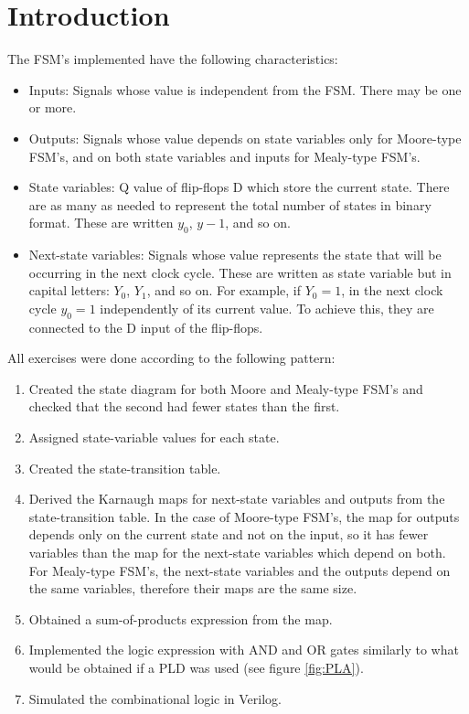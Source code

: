 \documentclass[e3_tp3_main.tex]{subfiles}
\begin{document}
\chapter*{Introduction}

\label{chapter:intro}

The FSM's implemented have the following characteristics:
\begin{itemize}
	\item Inputs: Signals whose value is independent from the FSM. There may be one or more.
	\item Outputs: Signals whose value depends on state variables only for Moore-type FSM's, and on both state variables and inputs for Mealy-type FSM's.
	\item State variables: Q value of flip-flops D which store the current state. There are as many as needed to represent the total number of states in binary format. These are written $y_0$, $y-1$, and so on.
	\item Next-state variables: Signals whose value represents the state that will be occurring in the next clock cycle. These are written as state variable but in capital letters: $Y_0$, $Y_1$, and so on. For example, if $Y_0=1$, in the next clock cycle $y_0=1$ independently of its current value. To achieve this, they are connected to the D input of the flip-flops.
\end{itemize}

All exercises were done according to the following pattern:
\begin{enumerate}
	\item Created the state diagram for both Moore and Mealy-type FSM's and checked that the second had fewer states than the first.
	\item Assigned state-variable values for each state.
	\item Created the state-transition table.
	\item Derived the Karnaugh maps for next-state variables and outputs from the state-transition table. In the case of Moore-type FSM's, the map for outputs depends only on the current state and not on the input, so it has fewer variables than the map for the next-state variables which depend on both. For Mealy-type FSM's, the next-state variables and the outputs depend on the same variables, therefore their maps are the same size.
	\item Obtained a sum-of-products expression from the map.
	\item Implemented the logic expression with AND and OR gates similarly to what would be obtained if a PLD was used (see figure \ref{fig:PLA}).
	\item Simulated the combinational logic in Verilog.
\end{enumerate}
\end{document}
